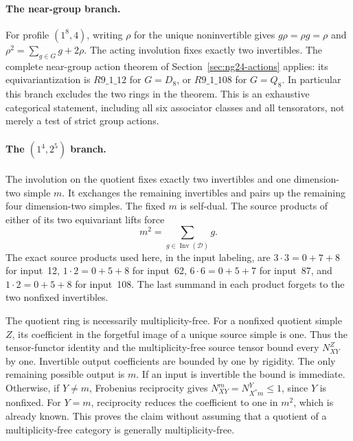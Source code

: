\paragraph{The near-group branch.}
For profile $(1^8,4)$, writing $\rho$ for the unique noninvertible gives
$g\rho=\rho g=\rho$ and
$\rho^2=\sum_{g\in G}g+2\rho$. The acting involution fixes exactly two
invertibles. The complete near-group action theorem of
Section~\ref{sec:ng24-actions} applies: its equivariantization is
$R9\_1\_12$ for $G=D_8$, or $R9\_1\_108$ for $G=Q_8$.
In particular this branch excludes the two rings in the theorem.
This is an exhaustive categorical statement, including all six associator
classes and all tensorators, not merely a test of strict group actions.

\paragraph[The rank-nine quotient branch]{The $(1^4,2^5)$ branch.}
The involution on the quotient fixes exactly two invertibles and one
dimension-two simple $m$. It exchanges the remaining invertibles and pairs
up the remaining four dimension-two simples. The fixed $m$ is self-dual.
The source products of either of its two equivariant lifts force
\[
 m^2=\sum_{g\in\operatorname{Inv}(\mathcal D)}g.
\]
The exact source products used here, in the input labeling, are
$3\cdot3=0+7+8$ for input~12, $1\cdot2=0+5+8$ for input~62,
$6\cdot6=0+5+7$ for input~87, and $1\cdot2=0+5+8$ for input~108.
The last summand in each product forgets to the two nonfixed invertibles.

The quotient ring is necessarily multiplicity-free. For a nonfixed
quotient simple $Z$, its coefficient in the forgetful image of a unique
source simple is one. Thus the tensor-functor identity and the
multiplicity-free source tensor bound every $N_{XY}^Z$ by one.
Invertible output coefficients are bounded by one by rigidity.
The only remaining possible output is $m$. If an input is invertible the
bound is immediate. Otherwise, if $Y\ne m$, Frobenius reciprocity gives
$N_{XY}^{m}=N_{X^*m}^{Y}\le1$, since $Y$ is nonfixed.
For $Y=m$, reciprocity reduces the coefficient to one in $m^2$, which is
already known. This proves the claim without assuming that a quotient of
a multiplicity-free category is generally multiplicity-free.

